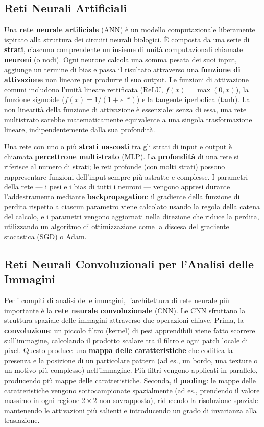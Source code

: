 \subsection{Reti Neurali Artificiali}

Una \textbf{rete neurale artificiale} (ANN) è un modello computazionale liberamente ispirato alla struttura dei circuiti neurali biologici. È composta da una serie di \textbf{strati}, ciascuno comprendente un insieme di unità computazionali chiamate \textbf{neuroni} (o nodi). Ogni neurone calcola una somma pesata dei suoi input, aggiunge un termine di bias e passa il risultato attraverso una \textbf{funzione di attivazione} non lineare per produrre il suo output. Le funzioni di attivazione comuni includono l'unità lineare rettificata (ReLU, $f(x) = \max(0, x)$), la funzione sigmoide ($f(x) = 1/(1+e^{-x})$) e la tangente iperbolica (tanh). La non linearità della funzione di attivazione è essenziale: senza di essa, una rete multistrato sarebbe matematicamente equivalente a una singola trasformazione lineare, indipendentemente dalla sua profondità.

Una rete con uno o più \textbf{strati nascosti} tra gli strati di input e output è chiamata \textbf{percettrone multistrato} (MLP). La \textbf{profondità} di una rete si riferisce al numero di strati; le reti profonde (con molti strati) possono rappresentare funzioni dell'input sempre più astratte e complesse. I parametri della rete — i pesi e i bias di tutti i neuroni — vengono appresi durante l'addestramento mediante \textbf{backpropagation}: il gradiente della funzione di perdita rispetto a ciascun parametro viene calcolato usando la regola della catena del calcolo, e i parametri vengono aggiornati nella direzione che riduce la perdita, utilizzando un algoritmo di ottimizzazione come la discesa del gradiente stocastica (SGD) o Adam.

\subsection{Reti Neurali Convoluzionali per l'Analisi delle Immagini}

Per i compiti di analisi delle immagini, l'architettura di rete neurale più importante è la \textbf{rete neurale convoluzionale} (CNN). Le CNN sfruttano la struttura spaziale delle immagini attraverso due operazioni chiave. Prima, la \textbf{convoluzione}: un piccolo filtro (kernel) di pesi apprendibili viene fatto scorrere sull'immagine, calcolando il prodotto scalare tra il filtro e ogni patch locale di pixel. Questo produce una \textbf{mappa delle caratteristiche} che codifica la presenza e la posizione di un particolare pattern (ad es., un bordo, una texture o un motivo più complesso) nell'immagine. Più filtri vengono applicati in parallelo, producendo più mappe delle caratteristiche. Seconda, il \textbf{pooling}: le mappe delle caratteristiche vengono sottocampionate spazialmente (ad es., prendendo il valore massimo in ogni regione $2 \times 2$ non sovrapposta), riducendo la risoluzione spaziale mantenendo le attivazioni più salienti e introducendo un grado di invarianza alla traslazione.

